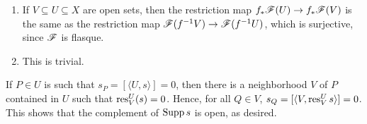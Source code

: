 \begin{exercise}
\begin{enumerate}[label=(\alph*)]
    \item If $V\subseteq U\subseteq X$ are open sets, then the restriction map $f_\ast\mathscr{F}(U)\to f_\ast\mathscr{F}(V)$ is the same as the restriction map $\mathscr{F}(f^{-1}V)\to\mathscr{F}(f^{-1}U)$, which is surjective, since $\mathscr{F}$ is flasque. 
    
    \item This is trivial.
\end{enumerate}
\end{exercise}

\begin{exercise}[Support]
    If $P\in U$ is such that $s_P = [\langle U, s\rangle] = 0$, then there is a neighborhood $V$ of $P$ contained in $U$ such that $\operatorname{res}^U_V(s) = 0$. Hence, for all $Q\in V$, $s_Q = [\langle V, \operatorname{res}^U_V s\rangle] = 0$. This shows that the complement of $\operatorname{Supp} s$ is open, as desired.
\end{exercise}
